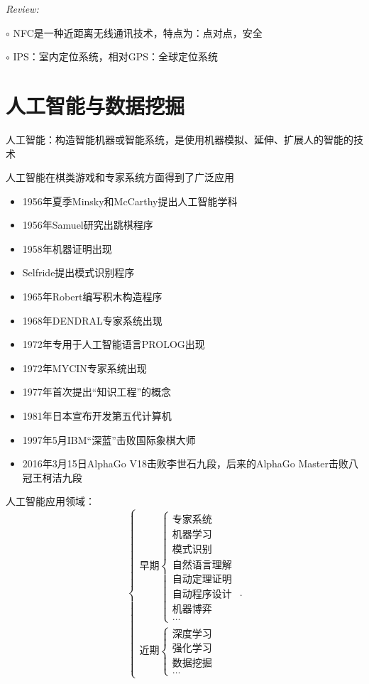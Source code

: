 \textit{Review:}

$\circ$ NFC是一种近距离无线通讯技术，特点为：点对点，安全

$\circ$ IPS：室内定位系统，相对GPS：全球定位系统
\section{人工智能与数据挖掘}%
\label{sec:人工智能与数据挖掘}
\begin{defi}
    人工智能：构造智能机器或智能系统，是使用机器模拟、延伸、扩展人的智能的技术
\end{defi}
人工智能在棋类游戏和专家系统方面得到了广泛应用
\begin{itemize}
    \item 1956年夏季Minsky和McCarthy提出人工智能学科
    \item 1956年Samuel研究出跳棋程序
    \item 1958年机器证明出现
    \item Selfride提出模式识别程序
    \item 1965年Robert编写积木构造程序
    \item 1968年DENDRAL专家系统出现
    \item 1972年专用于人工智能语言PROLOG出现
    \item 1972年MYCIN专家系统出现
    \item 1977年首次提出“知识工程”的概念
    \item 1981年日本宣布开发第五代计算机
    \item 1997年5月IBM“深蓝”击败国际象棋大师
    \item 2016年3月15日AlphaGo V18击败李世石九段，后来的AlphaGo Master击败八冠王柯洁九段
\end{itemize}
人工智能应用领域：
\[
    \begin{cases}
        \text{早期}\begin{cases}
            \text{专家系统}\\
            \text{机器学习}\\
            \text{模式识别}\\
            \text{自然语言理解}\\
            \text{自动定理证明}\\
            \text{自动程序设计}\\
            \text{机器博弈}\\
            \ldots
        \end{cases}\\
        \text{近期}\begin{cases}
            \text{深度学习}\\
            \text{强化学习}\\
            \text{数据挖掘}\\
            \ldots
        \end{cases}
    \end{cases}
.\] 
